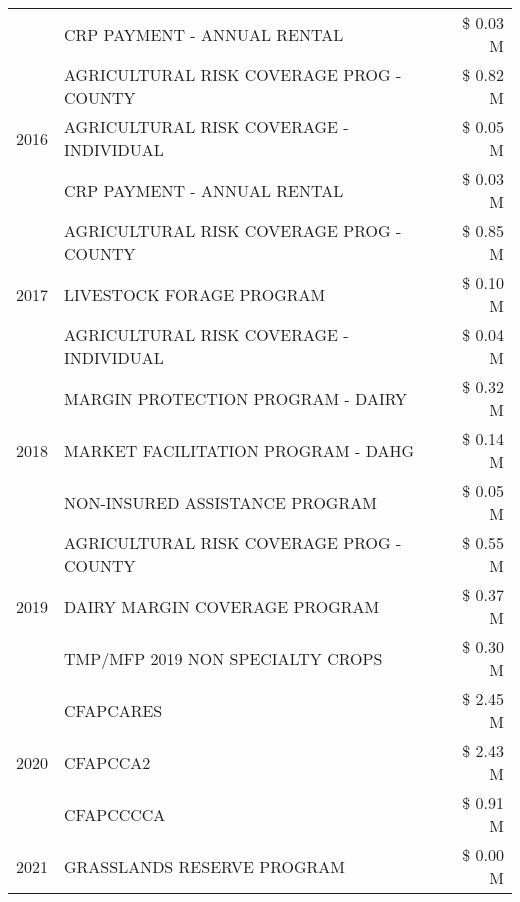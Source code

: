 \begin{tabular}{llr}
 & CRP PAYMENT - ANNUAL RENTAL & \$ 0.03 M \\
\cline{1-3}
\multirow[t]{3}{*}{2016} & AGRICULTURAL RISK COVERAGE PROG - COUNTY & \$ 0.82 M \\
 & AGRICULTURAL RISK COVERAGE - INDIVIDUAL & \$ 0.05 M \\
 & CRP PAYMENT - ANNUAL RENTAL & \$ 0.03 M \\
\cline{1-3}
\multirow[t]{3}{*}{2017} & AGRICULTURAL RISK COVERAGE PROG - COUNTY & \$ 0.85 M \\
 & LIVESTOCK FORAGE PROGRAM & \$ 0.10 M \\
 & AGRICULTURAL RISK COVERAGE - INDIVIDUAL & \$ 0.04 M \\
\cline{1-3}
\multirow[t]{3}{*}{2018} & MARGIN PROTECTION PROGRAM - DAIRY & \$ 0.32 M \\
 & MARKET FACILITATION PROGRAM - DAHG & \$ 0.14 M \\
 & NON-INSURED ASSISTANCE PROGRAM & \$ 0.05 M \\
\cline{1-3}
\multirow[t]{3}{*}{2019} & AGRICULTURAL RISK COVERAGE PROG - COUNTY & \$ 0.55 M \\
 & DAIRY MARGIN COVERAGE PROGRAM & \$ 0.37 M \\
 & TMP/MFP 2019 NON SPECIALTY CROPS & \$ 0.30 M \\
\cline{1-3}
\multirow[t]{3}{*}{2020} & CFAPCARES & \$ 2.45 M \\
 & CFAPCCA2 & \$ 2.43 M \\
 & CFAPCCCCA & \$ 0.91 M \\
\cline{1-3}
2021 & GRASSLANDS RESERVE PROGRAM & \$ 0.00 M \\
\cline{1-3}
\bottomrule
\end{tabular}

